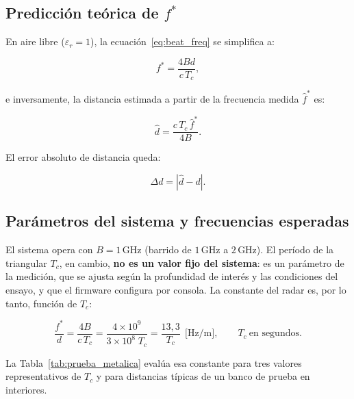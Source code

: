 \documentclass[12pt, a4paper, twoside]{report}
\begin{document}
\subsection{Predicción teórica de $f^*$}

En aire libre ($\varepsilon_r = 1$), la ecuación~\eqref{eq:beat_freq}
se simplifica a:

\begin{equation}
  f^* = \frac{4Bd}{c\,T_c},
  \label{eq:beat_freq_aire}
\end{equation}

e inversamente, la distancia estimada a partir de la frecuencia
medida $\hat{f}^*$ es:

\begin{equation}
  \hat{d} = \frac{c\,T_c\,\hat{f}^*}{4B}.
  \label{eq:d_estimada}
\end{equation}

El error absoluto de distancia queda:

\begin{equation}
  \Delta d = \left|\hat{d} - d\right|.
  \label{eq:error_d}
\end{equation}

\subsection{Parámetros del sistema y frecuencias esperadas}

El sistema opera con $B = 1\,\text{GHz}$ (barrido de $1\,\text{GHz}$ a
$2\,\text{GHz}$). El período de la triangular $T_c$, en cambio, \textbf{no es un
valor fijo del sistema}: es un parámetro de la medición, que se ajusta según la
profundidad de interés y las condiciones del ensayo, y que el firmware configura
por consola. La constante del radar es, por lo tanto, función de $T_c$:

\begin{equation}
  \frac{f^*}{d} = \frac{4B}{c\,T_c}
  = \frac{4\times10^9}{3\times10^8\;T_c}
  = \frac{13{,}3}{T_c}\ \ \text{[Hz/m]},
  \qquad T_c\ \text{en segundos}.
  \label{eq:constante_radar}
\end{equation}

La Tabla~\ref{tab:prueba_metalica} evalúa esa constante para tres valores
representativos de $T_c$ y para distancias típicas de un banco de prueba en
interiores.
\end{document}
